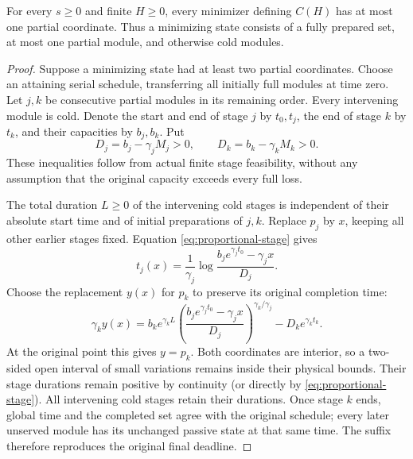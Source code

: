 \begin{theorem}
\label{thm:concentration}
For every \(s\geq0\) and finite \(H\geq0\), every minimizer defining \(C(H)\)
has at most one partial coordinate. Thus a minimizing state consists of a
fully prepared set, at most one partial module, and otherwise cold modules.
\end{theorem}
\begin{proof}
Suppose a minimizing state had at least two partial coordinates. Choose an
attaining serial schedule, transferring all initially full modules at time
zero. Let \(j,k\) be consecutive partial modules in its remaining order.
Every intervening module is cold. Denote the start and end of stage \(j\)
by \(t_0,t_j\), the end of stage \(k\) by \(t_k\), and their capacities by
\(b_j,b_k\). Put
\[
 D_j=b_j-\gamma_jM_j>0,\qquad
 D_k=b_k-\gamma_kM_k>0.
\]
These inequalities follow from actual finite stage feasibility, without any
assumption that the original capacity exceeds every full loss.

The total duration \(L\geq0\) of the intervening cold stages is independent
of their absolute start time and of initial preparations of \(j,k\).
Replace \(p_j\) by \(x\), keeping all other earlier stages fixed. Equation
\eqref{eq:proportional-stage} gives
\[
 t_j(x)=\frac1{\gamma_j}
 \log\frac{b_j e^{\gamma_jt_0}-\gamma_jx}{D_j}.
\]
Choose the replacement \(y(x)\) for \(p_k\) to preserve its original
completion time:
\begin{equation}
 \gamma_k y(x)=
 b_k e^{\gamma_k L}
 \left(\frac{b_j e^{\gamma_jt_0}-\gamma_jx}{D_j}\right)^{\gamma_k/\gamma_j}
 -D_k e^{\gamma_k t_k}.
 \label{eq:pair-compensation}
\end{equation}
At the original point this gives \(y=p_k\). Both coordinates are interior,
so a two-sided open interval of small variations remains inside their
physical bounds. Their stage durations remain positive by continuity
(or directly by \eqref{eq:proportional-stage}). All intervening cold stages
retain their durations. Once stage \(k\) ends, global time and the completed
set agree with the original schedule; every later unserved module has its
unchanged passive state at that same time. The suffix therefore reproduces
the original final deadline.


\end{proof}
